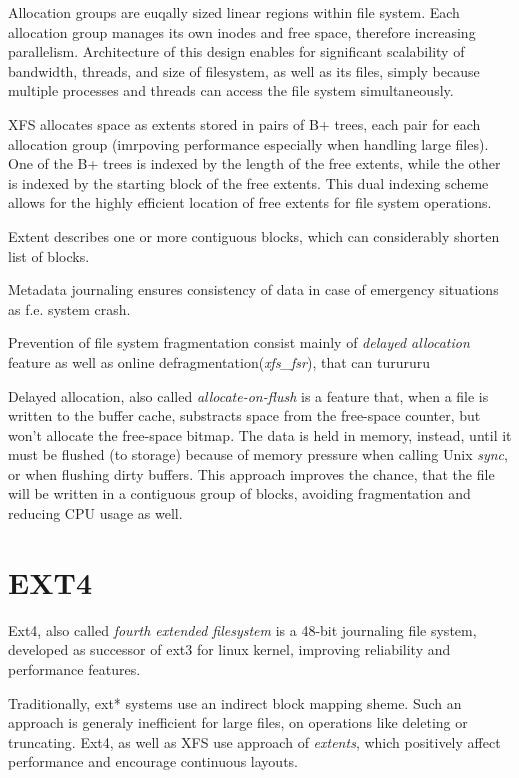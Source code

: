 \documentclass[
  color, %
  table, %
  lof,   %
  lot,   %
]{fithesis3}
\begin{document}
Allocation groups are euqally sized linear regions within file system. Each allocation group manages its own inodes and free space, therefore increasing parallelism.
Architecture of this design enables for significant scalability of bandwidth, threads, and size of filesystem, as well as its files, simply because multiple processes and threads can access the file system simultaneously.

XFS allocates space as extents stored in pairs of B+ trees, each pair for each allocation group (imrpoving performance especially when handling large files). One of the B+ trees is indexed by the length of the free extents, while the other is indexed by the starting block of the free extents. This dual indexing scheme allows for the highly efficient location of free extents for file system operations.

Extent describes one or more contiguous blocks, which can considerably shorten list of blocks.
 
Metadata journaling ensures consistency of data in case of emergency situations as f.e. system crash.

Prevention of file system fragmentation consist mainly of \textit{delayed allocation} feature as well as online defragmentation(\textit{xfs\_fsr}), that can turururu

Delayed allocation, also called \textit{allocate-on-flush} is a feature that, when a file is written to the buffer cache, substracts space from the free-space counter, but won't allocate the free-space bitmap. The data is held in memory, instead, until it must be flushed (to storage) because of memory pressure when calling Unix \textit{sync}, or when flushing dirty buffers. This approach improves the chance, that the file will be written in a contiguous group of blocks, avoiding fragmentation and reducing CPU usage as well.

\section{EXT4}
Ext4, also called \textit{fourth extended filesystem} is a 48-bit journaling file system, developed as successor of ext3 for linux kernel, improving reliability and performance features.

Traditionally, ext* systems use an indirect block mapping sheme. Such an approach is generaly inefficient for large files, on operations like deleting or truncating. Ext4, as well as XFS use approach of \textit{extents}, which positively affect performance and encourage continuous layouts.
\end{document}
